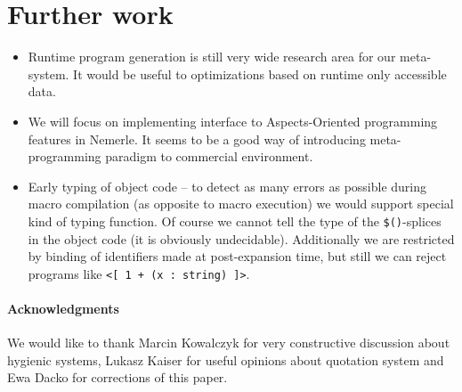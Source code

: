 \documentclass{llncs}
\begin{document}
\section{Further work}
\begin{itemize}
\item Runtime program generation is still very wide research area for our meta-system.
  It would be useful to optimizations based on runtime only accessible data.
\item We will focus on implementing interface to Aspects-Oriented programming features
  in Nemerle. It seems to be a good way of introducing meta-programming paradigm to 
  commercial environment.
\item Early typing of object code --
  to detect as many errors as possible during macro compilation (as opposite to
  macro execution) we would support special kind of typing function.
  Of course we cannot tell the type of the \verb,$(),-splices in the object
  code (it is obviously undecidable). Additionally we are restricted by binding
  of identifiers made at post-expansion time, but still we can reject programs like
  \verb,<[ 1 + (x : string) ]>,.
\end{itemize}

\paragraph{Acknowledgments}
We would like to thank Marcin Kowalczyk for very constructive discussion about hygienic
systems, Lukasz Kaiser for useful opinions about quotation system and Ewa Dacko for
corrections of this paper.
\end{document}
